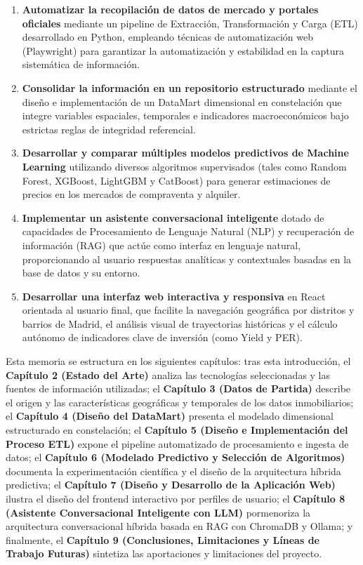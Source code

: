 \documentclass[a4paper,11pt,openany]{book}
\begin{document}
\begin{enumerate}
    \item \textbf{Automatizar la recopilación de datos de mercado y portales oficiales} mediante un pipeline de Extracción, Transformación y Carga (ETL) desarrollado en Python, empleando técnicas de automatización web (Playwright) para garantizar la automatización y estabilidad en la captura sistemática de información.
    \item \textbf{Consolidar la información en un repositorio estructurado} mediante el diseño e implementación de un DataMart dimensional en constelación que integre variables espaciales, temporales e indicadores macroeconómicos bajo estrictas reglas de integridad referencial.
    \item \textbf{Desarrollar y comparar múltiples modelos predictivos de Machine Learning} utilizando diversos algoritmos supervisados (tales como Random Forest, XGBoost, LightGBM y CatBoost) para generar estimaciones de precios en los mercados de compraventa y alquiler.
    \item \textbf{Implementar un asistente conversacional inteligente} dotado de capacidades de Procesamiento de Lenguaje Natural (NLP) y recuperación de información (RAG) que actúe como interfaz en lenguaje natural, proporcionando al usuario respuestas analíticas y contextuales basadas en la base de datos y su entorno.
    \item \textbf{Desarrollar una interfaz web interactiva y responsiva} en React orientada al usuario final, que facilite la navegación geográfica por distritos y barrios de Madrid, el análisis visual de trayectorias históricas y el cálculo autónomo de indicadores clave de inversión (como Yield y PER).
\end{enumerate}

Esta memoria se estructura en los siguientes capítulos: tras esta introducción, el \textbf{Capítulo 2 (Estado del Arte)} analiza las tecnologías seleccionadas y las fuentes de información utilizadas; el \textbf{Capítulo 3 (Datos de Partida)} describe el origen y las características geográficas y temporales de los datos inmobiliarios; el \textbf{Capítulo 4 (Diseño del DataMart)} presenta el modelado dimensional estructurado en constelación; el \textbf{Capítulo 5 (Diseño e Implementación del Proceso ETL)} expone el pipeline automatizado de procesamiento e ingesta de datos; el \textbf{Capítulo 6 (Modelado Predictivo y Selección de Algoritmos)} documenta la experimentación científica y el diseño de la arquitectura híbrida predictiva; el \textbf{Capítulo 7 (Diseño y Desarrollo de la Aplicación Web)} ilustra el diseño del frontend interactivo por perfiles de usuario; el \textbf{Capítulo 8 (Asistente Conversacional Inteligente con LLM)} pormenoriza la arquitectura conversacional híbrida basada en RAG con ChromaDB y Ollama; y finalmente, el \textbf{Capítulo 9 (Conclusiones, Limitaciones y Líneas de Trabajo Futuras)} sintetiza las aportaciones y limitaciones del proyecto.
\end{document}
